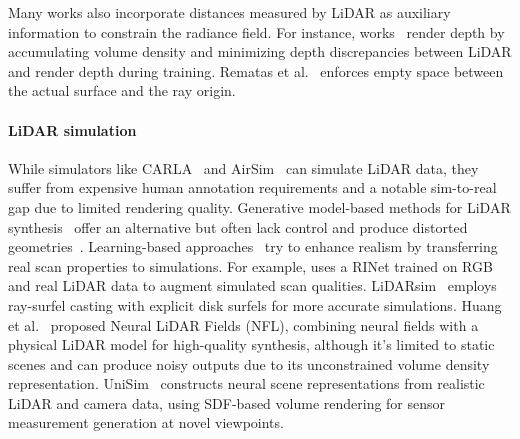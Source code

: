 Many works also incorporate distances measured by LiDAR as auxiliary information to constrain the radiance field. For instance, works~\cite{chang2023neural, wang2023neural} render depth by accumulating volume density and minimizing depth discrepancies between LiDAR and render depth during training. Rematas et al.~\cite{rematas2022urban} enforces empty space between the actual surface and the ray origin.


\paragraph{LiDAR simulation} 
While simulators like CARLA~\cite{dosovitskiy2017carla} and AirSim~\cite{shah2018airsim} can simulate LiDAR data, they suffer from expensive human annotation requirements and a notable sim-to-real gap due to limited rendering quality. Generative model-based methods for LiDAR synthesis~\cite{caccia2019deep,zyrianov2022learning} offer an alternative but often lack control and produce distorted geometries~\cite{li2023pcgen}.
Learning-based approaches~\cite{li2023pcgen,fang2020augmented,manivasagam2020lidarsim} try to enhance realism by transferring real scan properties to simulations. For example, \cite{guillard2022learning} uses a RINet trained on RGB and real LiDAR data to augment simulated scan qualities. LiDARsim~\cite{manivasagam2020lidarsim} employs ray-surfel casting with explicit disk surfels for more accurate simulations.
Huang et al.~\cite{Huang2023nfl} proposed Neural LiDAR Fields (NFL), combining neural fields with a physical LiDAR model for high-quality synthesis, although it's limited to static scenes and can produce noisy outputs due to its unconstrained volume density representation.
UniSim~\cite{yang2023unisim} constructs neural scene representations from realistic LiDAR and camera data, using SDF-based volume rendering for sensor measurement generation at novel viewpoints.

